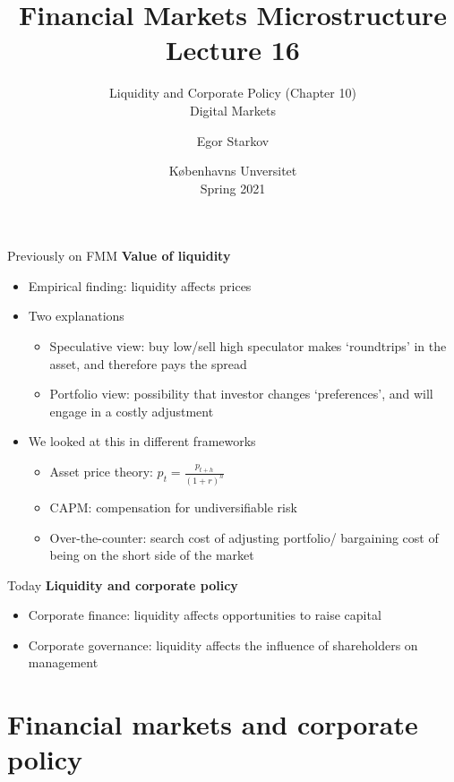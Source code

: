 \documentclass[english,10pt
,aspectratio=169
]{beamer}
\title{Financial Markets Microstructure \\ Lecture 16}
\subtitle{Liquidity and Corporate Policy (Chapter 10)\\
	Digital Markets}
\author{Egor Starkov}
\date{K{\o}benhavns Unversitet \\
	Spring 2021}
\begin{document}
\frame[plain]{\titlepage}


\begin{frame}{Previously on FMM}
	\textbf{Value of liquidity}
	\begin{itemize}
		\item Empirical finding: liquidity affects prices
		\item Two explanations
		\begin{itemize}
			\item Speculative view: buy low/sell high speculator makes `roundtrips' in the asset, and therefore pays the spread
			\item Portfolio view: possibility that investor changes `preferences', and will engage in a costly adjustment
		\end{itemize}
		\item We looked at this in different frameworks
		\begin{itemize}
			\item Asset price theory: $p_{t}= \frac{p_{t+h}}{(1+r)^{h}}$
			\item CAPM: compensation for undiversifiable risk
			\item Over-the-counter: search cost of adjusting portfolio/ bargaining cost of being on the short side of the market
		\end{itemize}
	\end{itemize}
\end{frame}


\begin{frame}{Today}
	\textbf{Liquidity and corporate policy}
	\begin{itemize}
		\item Corporate finance: liquidity affects opportunities to raise capital
		\item Corporate governance: liquidity affects the influence of shareholders on management
	\end{itemize}
\end{frame}



\section{Financial markets and corporate policy}
\end{document}
